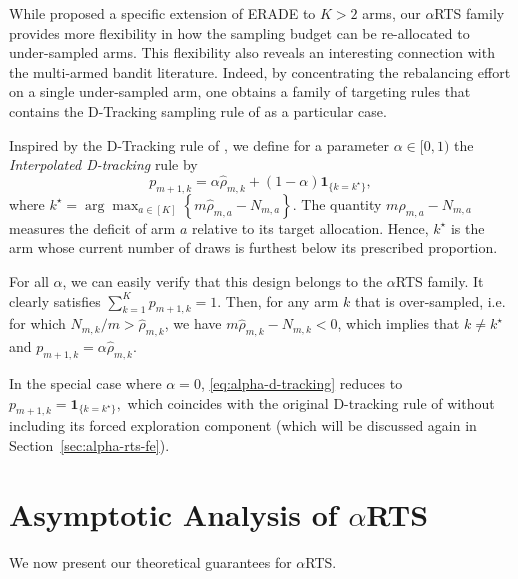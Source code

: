 \smallskip

While \citet{alkhnefr2025efficient} proposed a specific extension of ERADE to $K>2$ arms, our $\alpha$RTS family provides more flexibility in how the sampling budget can be re-allocated to under-sampled arms. This flexibility also reveals an interesting connection with the
	multi-armed bandit literature. Indeed, by concentrating the rebalancing
	effort on a single under-sampled arm, one obtains a family of targeting
	rules that contains the D-Tracking sampling rule of \cite{garivier2016optimal} as a particular case.
	
	\begin{example}
		Inspired by the D-Tracking rule of \cite{garivier2016optimal}, we define for a parameter $\alpha \in [0,1)$ the \textit{Interpolated D-tracking} rule by
		\begin{equation}\label{eq:alpha-d-tracking}
			p_{m+1,k}
			=
			\alpha \hat \rho_{m,k}
			+
			(1-\alpha)\mathbf 1_{\{k=k^\star\}},
		\end{equation}
		where \(k^\star
		=
		\arg\max_{a\in[K]}
		\left\{
		m\hat \rho_{m,a}-N_{m,a}
		\right\}
		\). The quantity $m\hat \rho_{m,a}-N_{m,a}$ measures the deficit of arm $a$
		relative to its target allocation. Hence, $k^\star$ is the arm whose
		current number of draws is furthest below its prescribed proportion.
		
		For all $\alpha$, we can easily verify that this design belongs to the $\alpha$RTS family. It clearly satisfies $\sum_{k=1}^{K} p_{m+1,k}=1$. Then, for any arm $k$ that is over-sampled, i.e. for which $N_{m,k}/m > \hat \rho_{m,k}$, we have $m\hat \rho_{m,k}-N_{m,k} < 0$, which implies that $k\neq k^\star$ and \(p_{m+1,k}
		=
		\alpha \hat \rho_{m,k}\).
		
		
		In the special case where $\alpha=0$, \eqref{eq:alpha-d-tracking} reduces to \(p_{m+1,k}
		=
		\mathbf 1_{\{k=k^\star\}},\)
		which coincides with the original D-tracking rule of
		\citet{garivier2016optimal} without including its forced exploration component (which will be discussed again in Section~\ref{sec:alpha-rts-fe}).
\end{example}

\section{Asymptotic Analysis of $\alpha$RTS} \label{sec:proof_vanilla}

We now present our theoretical guarantees for $\alpha$RTS.

